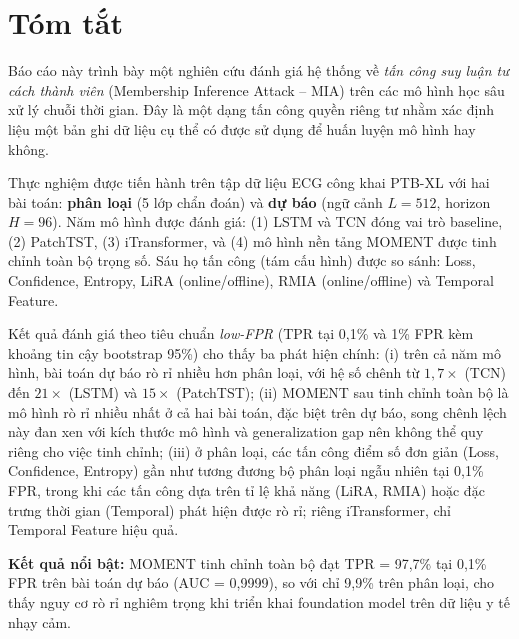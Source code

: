 \documentclass[12pt,a4paper]{report}
\begin{document}
\chapter*{Tóm tắt}

Báo cáo này trình bày một nghiên cứu đánh giá hệ thống về \textit{tấn công suy luận tư cách thành viên} (Membership Inference Attack -- MIA) trên các mô hình học sâu xử lý chuỗi thời gian. Đây là một dạng tấn công quyền riêng tư nhằm xác định liệu một bản ghi dữ liệu cụ thể có được sử dụng để huấn luyện mô hình hay không.

Thực nghiệm được tiến hành trên tập dữ liệu ECG công khai PTB-XL với hai bài toán: \textbf{phân loại} (5 lớp chẩn đoán) và \textbf{dự báo} (ngữ cảnh $L = 512$, horizon $H = 96$). Năm mô hình được đánh giá: (1) LSTM và TCN đóng vai trò baseline, (2) PatchTST, (3) iTransformer, và (4) mô hình nền tảng MOMENT được tinh chỉnh toàn bộ trọng số. Sáu họ tấn công (tám cấu hình) được so sánh: Loss, Confidence, Entropy, LiRA (online/offline), RMIA (online/offline) và Temporal Feature.

Kết quả đánh giá theo tiêu chuẩn \textit{low-FPR} (TPR tại 0,1\% và 1\% FPR kèm khoảng tin cậy bootstrap 95\%) cho thấy ba phát hiện chính: (i) trên cả năm mô hình, bài toán dự báo rò rỉ nhiều hơn phân loại, với hệ số chênh từ $1{,}7\times$ (TCN) đến $21\times$ (LSTM) và $15\times$ (PatchTST); (ii) MOMENT sau tinh chỉnh toàn bộ là mô hình rò rỉ nhiều nhất ở cả hai bài toán, đặc biệt trên dự báo, song chênh lệch này đan xen với kích thước mô hình và generalization gap nên không thể quy riêng cho việc tinh chỉnh; (iii) ở phân loại, các tấn công điểm số đơn giản (Loss, Confidence, Entropy) gần như tương đương bộ phân loại ngẫu nhiên tại 0,1\% FPR, trong khi các tấn công dựa trên tỉ lệ khả năng (LiRA, RMIA) hoặc đặc trưng thời gian (Temporal) phát hiện được rò rỉ; riêng iTransformer, chỉ Temporal Feature hiệu quả.

\textbf{Kết quả nổi bật:} MOMENT tinh chỉnh toàn bộ đạt TPR = 97,7\% tại 0,1\% FPR trên bài toán dự báo (AUC = 0,9999), so với chỉ 9,9\% trên phân loại, cho thấy nguy cơ rò rỉ nghiêm trọng khi triển khai foundation model trên dữ liệu y tế nhạy cảm.

\tableofcontents
\listoftables
\listoffigures
\end{document}
